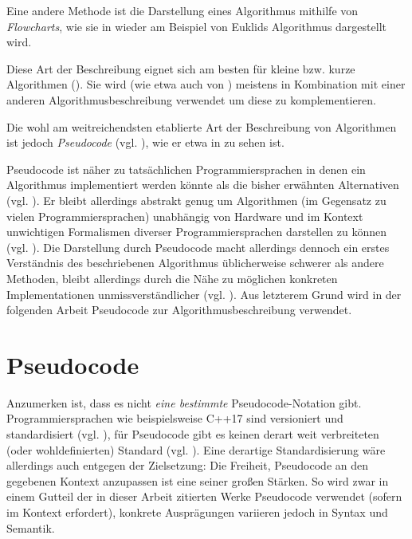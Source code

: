 
Eine andere Methode ist die Darstellung eines Algorithmus mithilfe von \emph{Flowcharts}, wie sie in  wieder am Beispiel von Euklids Algorithmus dargestellt wird.



Diese Art der Beschreibung eignet sich am besten für kleine bzw. kurze Algorithmen (\cite[5]{hsr1997}). Sie wird (wie etwa auch von \citeauthor{taocp1}) meistens in Kombination mit einer anderen Algorithmusbeschreibung verwendet um diese zu komplementieren.

Die wohl am weitreichendsten etablierte Art der Beschreibung von Algorithmen ist jedoch \emph{Pseudocode} (vgl. \cite[147]{zob2015}), wie er etwa in  zu sehen ist.



Pseudocode ist näher zu tatsächlichen Programmiersprachen in denen ein Algorithmus implementiert werden könnte als die bisher erwähnten Alternativen (vgl. \cite[1]{ofn2015}). Er bleibt allerdings abstrakt genug um Algorithmen (im Gegensatz zu vielen Programmiersprachen) unabhängig von Hardware und im Kontext unwichtigen Formalismen diverser Programmiersprachen darstellen zu können (vgl. \cite[1]{bem1958}). Die Darstellung durch Pseudocode macht allerdings dennoch ein erstes Verständnis des beschriebenen Algorithmus üblicherweise schwerer als andere Methoden, bleibt allerdings durch die Nähe zu möglichen konkreten Implementationen unmissverständlicher (vgl. \cite[147]{zob2015}). Aus letzterem Grund wird in der folgenden Arbeit Pseudocode zur Algorithmusbeschreibung verwendet.

\section{Pseudocode}

Anzumerken ist, dass es nicht \emph{eine bestimmte} Pseudocode-Notation gibt. Programmiersprachen wie beispielsweise C++17 sind versioniert und standardisiert (vgl. \cite{ISO-C++17}), für Pseudocode gibt es keinen derart weit verbreiteten (oder wohldefinierten) Standard (vgl. \cite{kni1996}). Eine derartige Standardisierung wäre allerdings auch entgegen der Zielsetzung: Die Freiheit, Pseudocode an den gegebenen Kontext anzupassen ist eine seiner großen Stärken. So wird zwar in einem Gutteil der in dieser Arbeit zitierten Werke Pseudocode verwendet (sofern im Kontext erfordert), konkrete Ausprägungen variieren jedoch in Syntax und Semantik\footnotemark.

